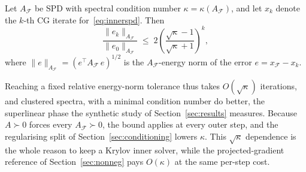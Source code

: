 \begin{proposition}\label{prop:cg}
  Let $A_{\mathcal{F}}$ be SPD with spectral condition number
  $\kappa = \kappa(A_{\mathcal{F}})$, and let $x_k$ denote the $k$-th CG iterate
  for~\eqref{eq:innerspd}. Then
  \[
    \frac{\lVert e_k\rVert_{A_{\mathcal{F}}}}{\lVert e_0\rVert_{A_{\mathcal{F}}}}
    \;\leq\;
    2\!\left(\frac{\sqrt{\kappa}-1}{\sqrt{\kappa}+1}\right)^{\!k},
  \]
  where $\lVert e\rVert_{A_{\mathcal{F}}} = (e^\top A_{\mathcal{F}}\,e)^{1/2}$ is the
  $A_{\mathcal{F}}$-energy norm of the error $e = x_{\mathcal{F}} - x_k$.
\end{proposition}

Reaching a fixed relative energy-norm tolerance thus takes
$O(\sqrt\kappa)$ iterations, and clustered spectra, with a minimal condition number do better, the
superlinear phase the synthetic study of Section~\ref{sec:results} measures. Because
$A \succ 0$ forces every $A_{\mathcal{F}} \succ 0$, the bound applies at every outer step, and
the regularising split of Section~\ref{sec:conditioning} lowers $\kappa$. This $\sqrt\kappa$
dependence is the whole reason to keep a Krylov inner solver, while the projected-gradient reference
of Section~\ref{sec:nonneg} pays $O(\kappa)$ at the same per-step cost.

